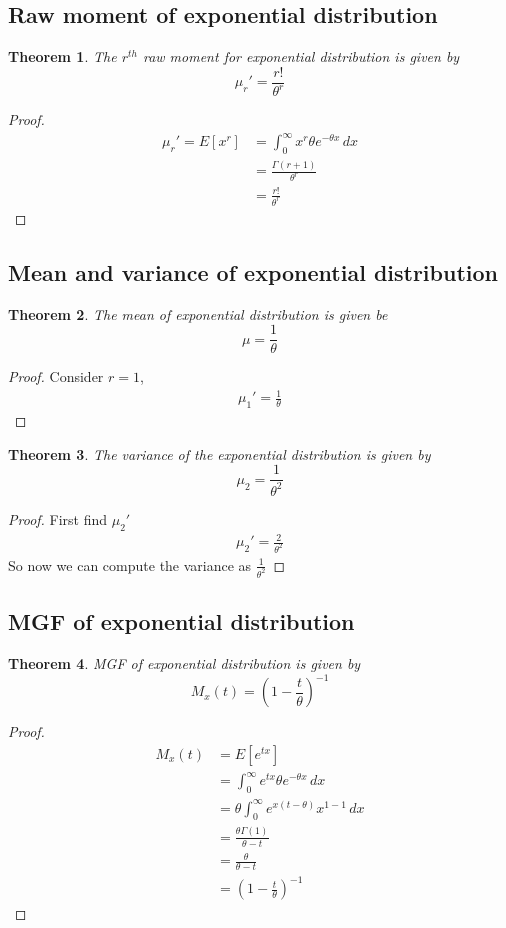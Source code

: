 \documentclass[oneside,11pt,pdftex]{book}%
\numberwithin{equation}{section}
\newtheorem{theorem}{Theorem}[chapter]%
\numberwithin{section}{chapter}
\numberwithin{equation}{chapter}
\begin{document}
\subsection{Raw moment of exponential distribution}

\begin{theorem}
	The $ r^{th} $ raw moment for exponential distribution is given by \[ \mu_r'=\frac{r!}{\theta^r} \]
\end{theorem}
\begin{proof}
	\begin{align*}
		\mu_r'=E[x^r]&=\int_0^\infty x^r \theta e^{-\theta x}\, dx\\
		&=\frac{\Gamma(r+1)}{\theta^r}\\
		&= \frac{r!}{\theta^r}
	\end{align*}
\end{proof}

\subsection{Mean and variance of exponential distribution}
\begin{theorem}
	The mean of exponential distribution is given be \[ \mu=\frac{1}{\theta} \]
\end{theorem}
\begin{proof}
	Consider $ r=1 $,
	\begin{align*}
		\mu_1'=\frac{1}{\theta}
	\end{align*}
\end{proof}

\begin{theorem}
	The variance of the exponential distribution is given by \[ \mu_2 = \frac{1}{\theta^2}\]
\end{theorem}
\begin{proof}
	First find $ \mu_2' $
	\begin{align*}
		\mu_2'=\frac{2}{\theta^2}
	\end{align*}
So now we can compute the variance as $ \frac{1}{\theta^2} $
\end{proof}

\subsection{MGF of exponential distribution}
\begin{theorem}
	MGF of exponential distribution is given by \[ M_x(t)= \left(1- \frac{t}{\theta}\right)^{-1} \]
\end{theorem}
\begin{proof}
	\begin{align*}
		M_x(t)&=E[e^{tx}]\\
		&=\int_0^\infty e^{tx} \theta e^{-\theta x}\, dx\\
		&=\theta \int_0^\infty e^{x(t-\theta)} x^{1-1}\, dx\\
		&= \frac{\theta \Gamma(1)}{\theta - t}\\
		&=\frac{\theta }{\theta-t}\\
		&= \left(1- \frac{t}{\theta}\right)^{-1}
	\end{align*}
\end{proof}
\end{document}
